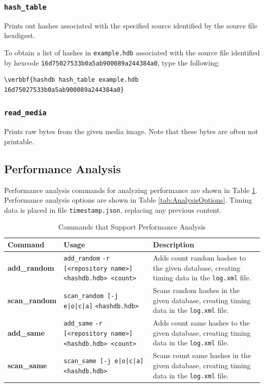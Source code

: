 \documentclass[11pt,fleqn]{article} %
\begin{document}
\subsubsection{\texttt{hash\_table}}
Prints out hashes associated with the specified source identified by the source file hexdigest.

To obtain a list of hashes in \texttt{example.hdb} associated with the source file identified by hexcode \texttt{16d75027533b0a5ab900089a244384a0}, type the following:
\begin{Verbatim}[commandchars=\\\{\}]
\verbbf{hashdb hash_table example.hdb 16d75027533b0a5ab900089a244384a0}
\end{Verbatim}

\subsubsection{\texttt{read\_media}}
Prints raw bytes from the given media image. Note that these bytes are often not printable.

\subsection{Performance Analysis}
\label{PerformanceAnalysis}
Performance analysis commands for analyzing \hdb performance are shown in Table \ref{tab:analysis}. Performance analysis options are shown in Table \ref{tab:AnalysisOptions}. Timing data is placed in file \verb+timestamp.json+, replacing any previous content.

\begin{table}[!ht]
\centering
\caption{Commands that Support \hdb Performance Analysis}
\label{tab:analysis}
\begin{tabular}{|p{3.5 cm}|p{6 cm}|p{4 cm}|}
\hline \hline
\textbf{Command} & \textbf{Usage} & \textbf{Description} \\
\hline
\textbf{add\_random} & \verb+add_random+ \verb+-r [<repository name>]+ \verb+<hashdb.hdb> <count>+ & Adds count random hashes to the given database, creating timing data in the \texttt{log.xml} file.\\
\hline
\textbf{scan\_random} & \verb+scan_random [-j e|o|c|a]+ \verb+<hashdb.hdb>+ & Scans random hashes in the given database, creating timing data in the \texttt{log.xml} file.\\
\hline
\textbf{add\_same} & \verb+add_same+ \verb+-r [<repository name>]+ \verb+<hashdb.hdb> <count>+ & Adds count same hashes to the given database, creating timing data in the \texttt{log.xml} file.\\
\hline
\textbf{scan\_same} & \verb+scan_same [-j e|o|c|a]+ \verb+<hashdb.hdb>+ & Scans count same hashes in the given database, creating timing data in the \texttt{log.xml} file.\\
\hline
\end{tabular}
\end{table}
\end{document}
